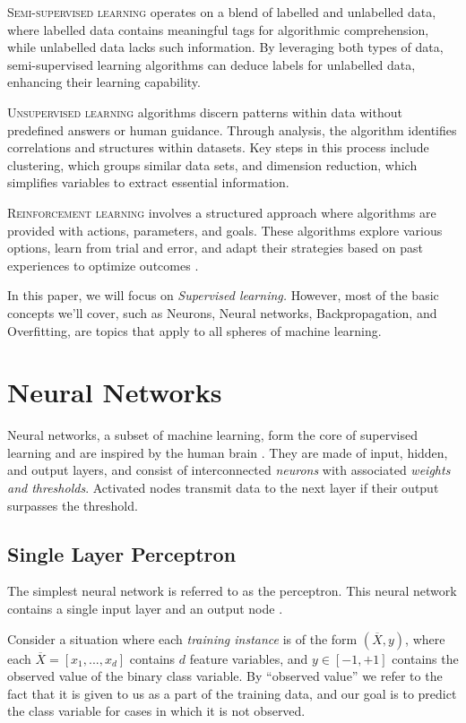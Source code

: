 \documentclass[nobib]{tufte-handout} %
\begin{document}
\vspace{4mm}
\noindent\textsc{Semi-supervised learning} operates on a blend of labelled and unlabelled data, where labelled data contains meaningful tags for algorithmic comprehension, while unlabelled data lacks such information. By leveraging both types of data, semi-supervised learning algorithms can deduce labels for unlabelled data, enhancing their learning capability.


\vspace{4mm}
\noindent\textsc{Unsupervised learning} algorithms discern patterns within data without predefined answers or human guidance. Through analysis, the algorithm identifies correlations and structures within datasets. Key steps in this process include clustering, which groups similar data sets, and dimension reduction, which simplifies variables to extract essential information.


\vspace{4mm}
\noindent\textsc{Reinforcement learning} involves a structured approach where algorithms are provided with actions, parameters, and goals. These algorithms explore various options, learn from trial and error, and adapt their strategies based on past experiences to optimize outcomes \citep{GuideML}.

In this paper, we will focus on \textit{Supervised learning.} However, most of the basic concepts we'll cover, such as Neurons, Neural networks, Backpropagation, and Overfitting, are topics that apply to all spheres of machine learning. 

\section{Neural Networks}
Neural networks, a subset of machine learning, form the core of supervised learning and are inspired by the human brain \citep{web:IBM:NN}. They are made of input, hidden, and output layers, and consist of interconnected \textit{neurons} with associated \textit{weights and thresholds}. Activated nodes transmit data to the next layer if their output surpasses the threshold. 
\subsection{Single Layer Perceptron}%
The simplest neural network is referred to as the perceptron. This neural network contains
a single input layer and an output node \citep{inbook:Aggarwal-1.2}.

Consider a situation where each \textit{training instance} is of the form $(\overline{X}, y)$, where each $\overline{X} = [x_1,..., x_d]$ contains $d$ feature variables, and $y \in [-1, +1]$ contains the observed value of the binary class variable. By “observed value” we refer to the fact that it is given to us as a part of the training data, and our goal is to predict the class variable for cases in which it is not observed.
\end{document}

